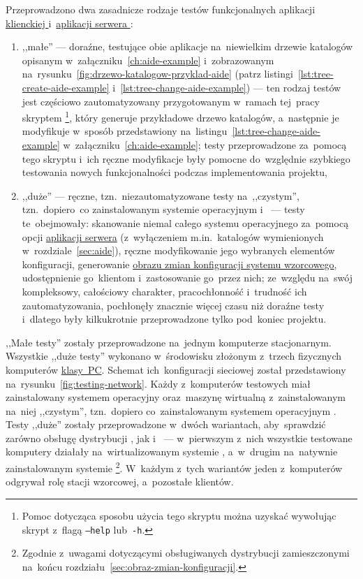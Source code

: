 \documentclass[thesis]{subfiles}
\begin{document}
Przeprowadzono dwa zasadnicze rodzaje testów funkcjonalnych aplikacji \hyperref[sec:cli-app]{klienckiej \texttt{\cliappname{}}} i~\hyperref[sec:srv-app]{aplikacji serwera \texttt{\srvappname{}}}:\mynobreakpar
\begin{enumerate}
	\item ,,małe'' --- doraźne, testujące obie aplikacje na~niewielkim drzewie katalogów opisanym w~załączniku~\ref{ch:aide-example} i~zobrazowanym na~rysunku~\ref{fig:drzewo-katalogow-przyklad-aide} (patrz listingi~\ref{lst:tree-create-aide-example} i~\ref{lst:tree-change-aide-example}) --- ten rodzaj testów jest częściowo zautomatyzowany przygotowanym w~ramach tej~pracy skryptem \footnote{Pomoc dotycząca sposobu użycia tego skryptu można uzyskać wywołując skrypt z~flagą \texttt{--help} lub~\texttt{-h}.}, który generuje przykładowe drzewo katalogów, a~następnie je modyfikuje w~sposób przedstawiony na~listingu~\ref{lst:tree-change-aide-example} w~załączniku~\ref{ch:aide-example}; testy przeprowadzone za~pomocą tego skryptu i~ich ręczne modyfikacje były pomocne do~względnie szybkiego testowania nowych funkcjonalności podczas implementowania projektu,
	\item ,,duże'' --- ręczne, tzn.~niezautomatyzowane testy na~,,czystym'', tzn.~dopiero~co zainstalowanym systemie operacyjnym  \arch{} i~\debian{} --- testy te~obejmowały: skanowanie niemal całego systemu operacyjnego za~pomocą opcji  \hyperref[sec:srv-app]{aplikacji serwera} (z~wyłączeniem m.in.~katalogów wymienionych w~rozdziale~\ref{sec:aide}), ręczne modyfikowanie jego wybranych elementów konfiguracji, generowanie \hyperref[sec:obraz-zmian-konfiguracji]{obrazu zmian konfiguracji systemu wzorcowego}, udostępnienie go~klientom i~zastosowanie go~przez nich; ze~względu na~swój kompleksowy, całościowy charakter, pracochłonność i~trudność ich zautomatyzowania, pochłonęły znacznie więcej czasu niż doraźne testy i~dlatego były kilkukrotnie przeprowadzone tylko pod~koniec projektu.
\end{enumerate}

,,Małe testy'' zostały przeprowadzone na~jednym komputerze stacjonarnym. Wszystkie ,,duże testy'' wykonano w~środowisku złożonym z~trzech fizycznych komputerów \href{https://en.wikipedia.org/wiki/Personal_computer}{klasy~PC}. Schemat ich~konfiguracji sieciowej został przedstawiony na~rysunku~\ref{fig:testing-network}. Każdy z~komputerów testowych miał zainstalowany systemem operacyjny \linuxdebian{} oraz~maszynę wirtualną  z~zainstalowanym na~niej ,,czystym'', tzn.~dopiero co~zainstalowanym systemem operacyjnym \linuxarch{}. Testy ,,duże'' zostały przeprowadzone w~dwóch wariantach, aby~sprawdzić zarówno obsługę dystrybucji \linuxarch{}, jak i~\linuxdebian{} --- w~pierwszym z~nich wszystkie testowane komputery działały na~wirtualizowanym systemie \arch{}, a~w~drugim na~natywnie zainstalowanym systemie \debian{}\footnote{Zgodnie z~uwagami dotyczącymi obsługiwanych dystrybucji  zamieszczonymi na~końcu rozdziału~\ref{sec:obraz-zmian-konfiguracji}.}. W~każdym z~tych wariantów jeden z~komputerów odgrywał rolę stacji wzorcowej, a~pozostałe klientów.
\end{document}
